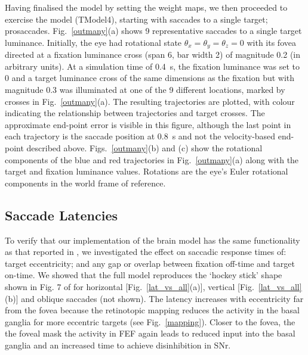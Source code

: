 \documentclass{frontiersSCNS}
\begin{document}
Having finalised the model by setting the weight maps, we then
proceeded to exercise the model (TModel4), starting with saccades to a
single target; prosaccades. Fig.~\ref{outmany}(a) shows 9
representative saccades to a single target luminance. Initially, the
eye had rotational state $\theta_x=\theta_y=\theta_z=0$ with its fovea
directed at a fixation luminance cross (span 6\dg, bar width 2\dg) of
magnitude 0.2 (in arbitrary units). At a simulation time of 0.4~s, the
fixation luminance was set to 0 and a target luminance cross of the
same dimensions as the fixation but with magnitude 0.3 was illuminated
at one of the 9 different locations, marked by crosses in
Fig.~\ref{outmany}(a).  The resulting trajectories are plotted, with
colour indicating the relationship between trajectories and target
crosses. The approximate end-point error is visible in this figure,
although the last point in each trajectory is the saccade position at
0.8~s and not the velocity-based end-point described
above. Figs.~\ref{outmany}(b) and (c) show the rotational components
of the blue and red trajectories in Fig.~\ref{outmany}(a) along with
the target and fixation luminance values. Rotations are the eye's
Euler rotational components in the world frame of reference.


\subsection{Saccade Latencies} \label{sec:results:latencies}

To verify that our implementation of the brain model has the same
functionality as that reported in \cite{cope_basal_2017}, we
investigated the effect on saccadic response times of: target
eccentricity; and any gap or overlap between fixation off-time and
target on-time. We showed that the full model reproduces the `hockey
stick' shape shown in Fig. 7 of \cite{cope_basal_2017} for horizontal
[Fig.~\ref{lat_vs_all}(a)], vertical [Fig.~\ref{lat_vs_all}(b)] and
oblique saccades (not shown). The latency increases with eccentricity
far from the fovea because the retinotopic mapping reduces the
activity in the basal ganglia for more eccentric targets (see
Fig.~\ref{mapping}). Closer to the fovea, the  the
foveal mask  the activity in FEF again leads to reduced input
into the basal ganglia and an increased time to achieve disinhibition
in SNr.
\end{document}
